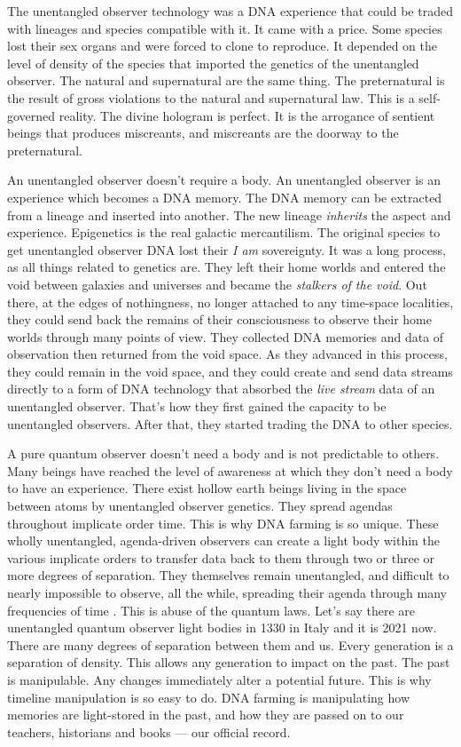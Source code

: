 The unentangled observer technology was a DNA experience that could be
traded with lineages and species compatible with it. It came with a
price. Some species lost their sex organs and were forced to clone to
reproduce. It depended on the level of density of the species that
imported the genetics of the unentangled observer. The natural and
supernatural are the same thing. The preternatural is the result of
gross violations to the natural and supernatural law. This is a
self-governed reality. The divine hologram is perfect. It is the
arrogance of sentient beings that produces miscreants, and miscreants
are the doorway to the preternatural.

An unentangled observer doesn't require a body. An unentangled observer
is an experience which becomes a DNA memory. The DNA memory can be
extracted from a lineage and inserted into another. The new lineage
\emph{inherits} the aspect and experience. Epigenetics is the real
galactic mercantilism. The original species to get unentangled observer
DNA lost their \emph{I am} sovereignty. It was a long process, as all
things related to genetics are. They left their home worlds and entered
the void between galaxies and universes and became the \emph{stalkers of
the void}. Out there, at the edges of nothingness, no longer attached to
any time-space localities, they could send back the remains of their
consciousness to observe their home worlds through many points of view.
They collected DNA memories and data of observation then returned from
the void space. As they advanced in this process, they could remain in
the void space, and they could create and send data streams directly to
a form of DNA technology that absorbed the \emph{live stream} data of an
unentangled observer. That's how they first gained the capacity to be
unentangled observers. After that, they started trading the DNA to other
species.

A pure quantum observer doesn't need a body and is not predictable to
others. Many beings have reached the level of awareness at which they
don't need a body to have an experience. There exist hollow earth beings
living in the space between atoms by unentangled observer genetics. They
spread agendas throughout implicate order time. This is why DNA farming
is so unique. These wholly unentangled, agenda-driven observers can
create a light body within the various implicate orders to transfer data
back to them through two or three or more degrees of separation. They
themselves remain unentangled, and difficult to nearly impossible to
observe, all the while, spreading their agenda through many frequencies
of time . This is abuse of the quantum laws. Let's say there are
unentangled quantum observer light bodies in 1330 in Italy and it is
2021 now. There are many degrees of separation between them and us.
Every generation is a separation of density. This allows any generation
to impact on the past. The past is manipulable. Any changes immediately
alter a potential future. This is why timeline manipulation is so easy
to do. DNA farming is manipulating how memories are light-stored in the
past, and how they are passed on to our teachers, historians and books
--- our official record.

